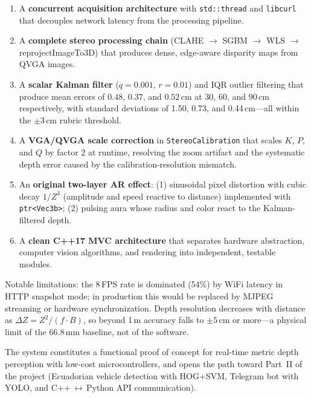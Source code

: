 \documentclass[12pt, a4paper]{article}
\begin{document}
\begin{enumerate}
  \item A \textbf{concurrent acquisition architecture} with \texttt{std::thread}
        and \texttt{libcurl} that decouples network latency from the processing pipeline.
  \item A \textbf{complete stereo processing chain}
        (CLAHE $\to$ SGBM $\to$ WLS $\to$ reprojectImageTo3D) that produces dense,
        edge-aware disparity maps from QVGA images.
  \item A \textbf{scalar Kalman filter} ($q=0.001$, $r=0.01$) and IQR outlier
        filtering that produce mean errors of $0.48$, $0.37$, and $0.52$\,cm
        at 30, 60, and 90\,cm respectively, with standard deviations of 1.50,
        0.73, and 0.44\,cm---all within the $\pm3$\,cm rubric threshold.
  \item A \textbf{VGA/QVGA scale correction} in \texttt{StereoCalibration} that
        scales $K$, $P$, and $Q$ by factor 2 at runtime, resolving the zoom artifact
        and the systematic depth error caused by the calibration-resolution mismatch.
  \item An \textbf{original two-layer AR effect}: (1) sinusoidal pixel distortion
        with cubic decay $1/Z^3$ (amplitude and speed reactive to distance)
        implemented with \texttt{ptr<Vec3b>}; (2) pulsing aura whose radius and
        color react to the Kalman-filtered depth.
  \item A \textbf{clean C++17 MVC architecture} that separates hardware abstraction,
        computer vision algorithms, and rendering into independent, testable modules.
\end{enumerate}

Notable limitations: the 8\,FPS rate is dominated (54\%) by WiFi latency in HTTP
snapshot mode; in production this would be replaced by MJPEG streaming or hardware
synchronization. Depth resolution decreases with distance as
$\Delta Z = Z^2/(f\cdot B)$, so beyond 1\,m accuracy falls to $\pm5$\,cm or more---a
physical limit of the 66.8\,mm baseline, not of the software.

The system constitutes a functional proof of concept for real-time metric depth
perception with low-cost microcontrollers, and opens the path toward Part~II of the
project (Ecuadorian vehicle detection with HOG+SVM, Telegram bot with YOLO, and
C++\,$\leftrightarrow$\,Python API communication).
\end{document}
